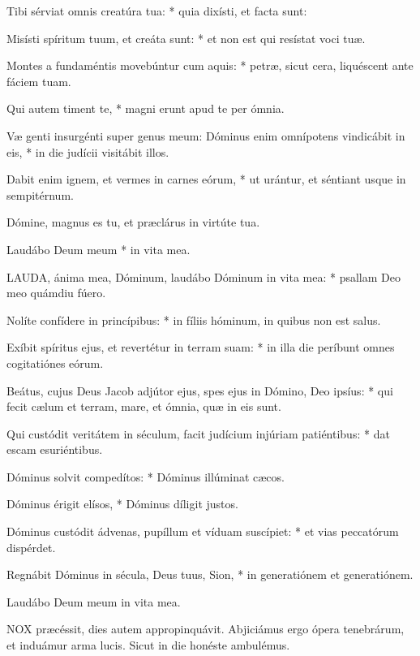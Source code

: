 Tibi sérviat omnis creatúra tua: * quia dixísti, et facta sunt:

Misísti spíritum tuum, et creáta sunt: * et non est qui resístat voci tuæ.

Montes a fundaméntis movebúntur cum aquis: * petræ, sicut cera, liquéscent ante fáciem tuam.

Qui autem timent te, * magni erunt apud te per ómnia.

Væ genti insurgénti super genus meum: Dóminus enim omnípotens vindicábit in eis, * in die judícii visitábit illos.

Dabit enim ignem, et vermes in carnes eórum, * ut urántur, et séntiant usque in sempitérnum.

 Dómine, magnus es tu, et præclárus in virtúte tua.

 Laudábo Deum meum * in vita mea.


\lettrine[lines=2]{L}{AUDA}, ánima mea, Dóminum, laudábo Dóminum in vita mea: * psallam Deo meo quámdiu fúero.

Nolíte confídere in princípibus: * in fíliis hóminum, in quibus non est salus.

Exíbit spíritus ejus, et revertétur in terram suam: * in illa die períbunt omnes cogitatiónes eórum.

Beátus, cujus Deus Jacob adjútor ejus, spes ejus in Dómino, Deo ipsíus: * qui fecit cælum et terram, mare, et ómnia, quæ in eis sunt.

Qui custódit veritátem in séculum, facit judícium injúriam patiéntibus: * dat escam esuriéntibus.

Dóminus solvit compedítos: * Dóminus illúminat cæcos.

Dóminus érigit elísos, * Dóminus díligit justos.

Dóminus custódit ádvenas, pupíllum et víduam suscípiet: * et vias peccatórum dispérdet.

Regnábit Dóminus in sécula, Deus tuus, Sion, * in generatiónem et generatiónem.

 Laudábo Deum meum in vita mea.



\lettrine[lines=2]{N}{OX} præcéssit, dies autem appropinquávit. Abjiciámus ergo ópera tenebrárum, et induámur arma lucis. Sicut in die honéste ambulémus.

